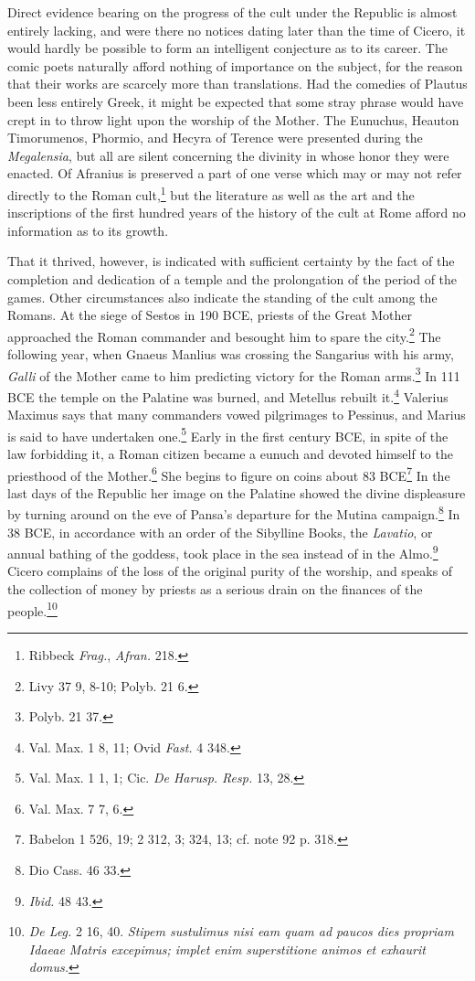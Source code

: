 \documentclass[a4paper, 11pt, oneside, polutonikogreek, english]{article}
\begin{document}
Direct evidence bearing on the progress of the cult under the Republic is almost entirely lacking, and were there no notices dating later than the time of Cicero, it would hardly be possible to form an intelligent conjecture as to its career. The comic poets naturally afford nothing of importance on the subject, for the reason that their works are scarcely more than translations. Had the comedies of Plautus been less entirely Greek, it might be expected that some stray phrase would have crept in to throw light upon the worship of the Mother. The Eunuchus, Heauton Timorumenos, Phormio, and Hecyra of Terence were presented during the \emph{Megalensia}, but all are silent concerning the divinity in whose honor they were enacted. Of Afranius is preserved a part of one verse which may or may not refer directly to the Roman cult,\footnote{Ribbeck \emph{Frag.}, \emph{Afran.} 218.} but the literature as well as the art and the inscriptions of the first hundred years of the history of the cult at Rome afford no information as to its growth.

That it thrived, however, is indicated with sufficient certainty by the fact of the completion and dedication of a temple and the prolongation of the period of the games. Other circumstances also indicate the standing of the cult among the Romans. At the siege of Sestos in 190 \textsc{BCE}, priests of the Great Mother approached the Roman commander and besought him to spare the city.\footnote{Livy 37 9, 8-10; Polyb. 21 6.} The following year, when Gnaeus Manlius was crossing the Sangarius with his army, \emph{Galli} of the Mother came to him predicting victory for the Roman arms.\footnote{Polyb. 21 37.} In 111 \textsc{BCE} the temple on the Palatine was burned, and Metellus rebuilt it.\footnote{Val. Max. 1 8, 11; Ovid \emph{Fast.} 4 348.} Valerius Maximus says that many commanders vowed pilgrimages to Pessinus, and Marius is said to have undertaken one.\footnote{Val. Max. 1 1, 1; Cic. \emph{De Harusp. Resp.} 13, 28.} Early in the first century \textsc{BCE}, in spite of the law forbidding it, a Roman citizen became a eunuch and devoted himself to the priesthood of the Mother.\footnote{Val. Max. 7 7, 6.} She begins to figure on coins about 83 \textsc{BCE}\footnote{Babelon 1 526, 19; 2 312, 3; 324, 13; cf. note 92 p. 318.} In the last days of the Republic her image on the Palatine showed the divine displeasure by turning around on the eve of Pansa's departure for the Mutina campaign.\footnote{Dio Cass. 46 33.} In 38 \textsc{BCE}, in accordance with an order of the Sibylline Books, the \emph{Lavatio}, or annual bathing of the goddess, took place in the sea instead of in the Almo.\footnote{\emph{Ibid.} 48 43.} Cicero complains of the loss of the original purity of the worship, and speaks of the collection of money by priests as a serious drain on the finances of the people.\footnote{\emph{De Leg.} 2 16, 40. \emph{Stipem sustulimus nisi eam quam ad paucos dies propriam Idaeae Matris excepimus; implet enim superstitione animos et exhaurit domus.}}
\end{document}

